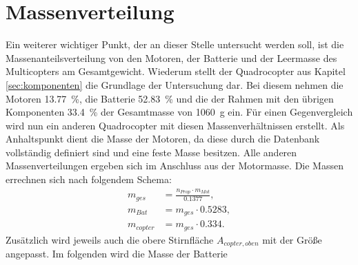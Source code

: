 \section{Massenverteilung}
\label{sec:massenverteilung}
Ein weiterer wichtiger Punkt, der an dieser Stelle untersucht werden soll, ist die Massenanteilsverteilung von den Motoren, der Batterie und der Leermasse des Multicopters am Gesamtgewicht. Wiederum stellt der Quadrocopter aus Kapitel \ref{sec:komponenten} die Grundlage der Untersuchung dar. Bei diesem nehmen die Motoren \SI{13,77}{\%}, die Batterie \SI{52,83}{\%} und die der Rahmen mit den übrigen Komponenten \SI{33,4}{\%} der Gesamtmasse von \SI{1060}{g} ein. Für einen Gegenvergleich wird nun ein anderen Quadrocopter mit diesen Massenverhältnissen erstellt. Als Anhaltspunkt dient die Masse der Motoren, da diese durch die Datenbank vollständig definiert sind und eine feste Masse besitzen. Alle anderen Massenverteilungen ergeben sich im Anschluss aus der Motormasse.
Die Massen errechnen sich nach folgendem Schema:
\begin{align}
	m_{ges} &= \frac{n_{Prop}\cdot m_{Mot}}{0.1377} , \\
	m_{Bat} &= m_{ges}\cdot 0.5283 , \\
	m_{copter} &= m_{ges}\cdot 0.334.
\end{align}
Zusätzlich wird jeweils auch die obere Stirnfläche \ensuremath{A_{copter,oben}} mit der Größe angepasst. Im folgenden wird die Masse der Batterie 

